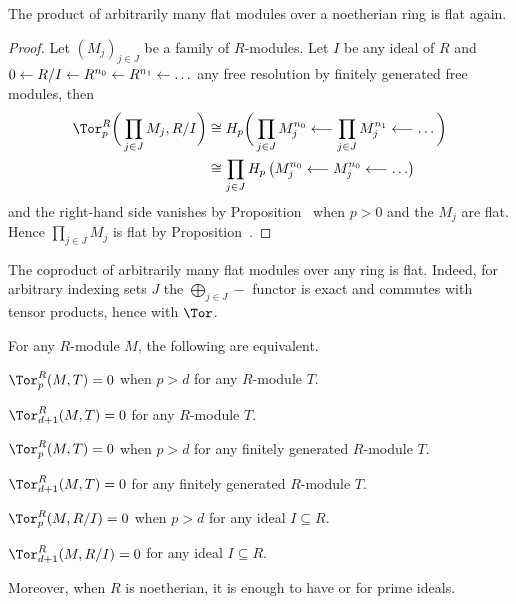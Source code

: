 \documentclass[a4paper,parskip=half,numbers=enddot, DIV=12]{scrreprt}
\begin{document}
\begin{example}
	The product of arbitrarily many flat modules over a noetherian ring is flat again.
\end{example}
\begin{proof}
	Let $(M_j)_{j\in J}$ be a family of $R$-modules. Let $I$ be any ideal of $R$ and $0\lmorphism R/I\lmorphism R^{n_0}\lmorphism R^{n_1}\lmorphism\ldots$ any free resolution by finitely generated free modules, then
	\begin{align*}
		\Tor_p^R\bigg(\prod_{j\in J}M_j,R/I\bigg)&\cong H_p\bigg(\prod_{j\in J}M_j^{n_0}\lmorphism\prod_{j\in J}M_j^{n_1}\lmorphism\ldots \bigg)\\
		&\cong \prod_{j\in J} H_p\left(M_j^{n_0}\lmorphism M_j^{n_0}\lmorphism\ldots\right)
	\end{align*}
	and the right-hand side vanishes by Proposition~ when $p>0$ and the $M_j$ are flat. Hence $\prod_{j\in J}M_j$ is flat by Proposition~.
\end{proof}
\begin{example}
	The coproduct of arbitrarily many flat modules over any ring is flat. Indeed, for arbitrary indexing sets $J$ the $\bigoplus_{j\in J}-$ functor is exact and commutes with tensor products, hence with $\Tor$.
\end{example}
\begin{fact}
	For any $R$-module $M$, the following are equivalent.
	\begin{alphanumerate}
		\item $\Tor_p^R(M,T)=0$ when $p>d$ for any $R$-module $T$.
		\item $\Tor_{d+1}^R(M,T)=0$ for any $R$-module $T$.
		\item $\Tor_p^R(M,T)=0$ when $p>d$ for any finitely generated $R$-module $T$.
		\item $\Tor_{d+1}^R(M,T)=0$ for any finitely generated $R$-module $T$.		
		\item $\Tor_p^R(M,R/I)=0$ when $p>d$ for any ideal $I\subseteq R$.
		\item $\Tor_{d+1}^R(M,R/I)=0$ for any ideal $I\subseteq R$.
	\end{alphanumerate}
	Moreover, when $R$ is noetherian, it is enough to have  or  for prime ideals.
\end{fact}
\end{document}
